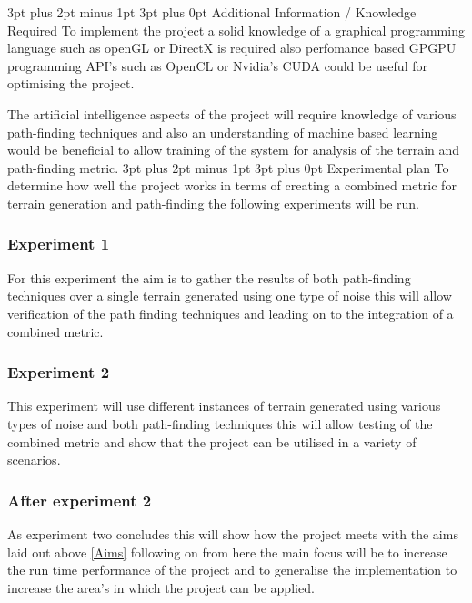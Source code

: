 \documentclass[12pt,a4paper]{article}
\makeatletter
\renewcommand\subsection{\@startsection {subsection}{1}{2mm} %
                               {3pt plus 2pt minus 1pt} %
                               {3pt plus 0pt} %
                               {\normalfont\bfseries}}
\makeatother
\begin{document}
\subsection{Additional Information / Knowledge Required}
To implement the project a solid knowledge of a graphical programming language such as openGL or DirectX is required also perfomance based GPGPU programming API's  such as OpenCL or Nvidia's CUDA could be useful for optimising the project.

The artificial intelligence aspects of the project will require knowledge of various path-finding techniques and also an understanding of machine based learning would be beneficial to allow training of the system for analysis of the terrain and path-finding metric.   
\subsection{Experimental plan}
To determine how well the project works in terms of creating a combined metric for terrain generation and path-finding the following experiments will be run.

\subsubsection{Experiment 1}
For this experiment the aim is to gather the results of both path-finding techniques over a single terrain generated using one type of noise this will allow verification of the path finding techniques and leading on to the integration of a combined metric. 

\subsubsection{Experiment 2}
This experiment will use different instances of terrain generated using various types of noise and both path-finding techniques this will allow testing of the combined metric and show that the project can be utilised in a variety of scenarios.

\subsubsection{After experiment 2} 
As experiment two concludes this will show how the project meets with the aims laid out above \ref{Aims} following on from here the main focus will be to increase the run time performance of the project and to generalise the implementation to increase the area's in which the project can be applied. 
\end{document}
